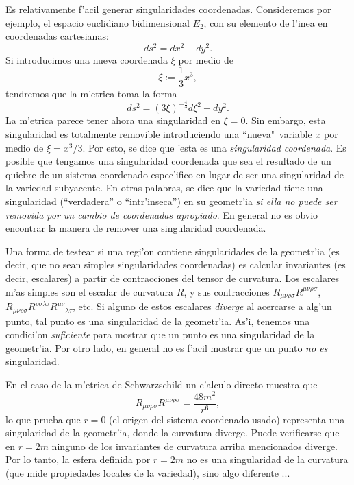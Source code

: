 Es relativamente f'acil generar singularidades coordenadas. Consideremos por ejemplo, el espacio euclidiano bidimensional $E_2$, con su elemento de l'inea en coordenadas cartesianas:
\begin{equation}
ds^2=dx^2+dy^2.
\end{equation}
Si introducimos una nueva coordenada $\xi$ por medio de
\begin{equation}
\xi:=\frac{1}{3}x^3,
\end{equation}
tendremos que la m'etrica toma la forma%
\begin{equation}
ds^2 =\left( 3\xi\right) ^{-\frac{4}{3}}d\xi^2+dy^2.
\end{equation}
La m'etrica parece tener ahora una singularidad en $\xi=0$. Sin embargo, esta
singularidad es totalmente removible introduciendo una ``nueva"\, variable $x$ por
medio de $\xi=x^3/3$. Por esto, se dice que 'esta es una
\textit{singularidad coordenada}. Es posible que tengamos una singularidad coordenada que sea el resultado de un quiebre de un sistema coordenado espec'ifico en lugar de ser una singularidad de la variedad subyacente. En otras palabras, se dice que la variedad tiene una singularidad (``verdadera'' o ``intr'inseca'') en su geometr'ia \textit{si ella no puede ser removida por un cambio de coordenadas apropiado}. En general no es obvio encontrar la manera de remover una singularidad coordenada.

Una forma de testear si una regi'on contiene singularidades de la geometr'ia (es decir, que no sean simples singularidades coordenadas) es calcular invariantes (es decir, escalares) a partir de contracciones del tensor de curvatura. Los escalares m'as simples son el escalar de curvatura
$R$, y sus contracciones $R_{\mu\nu\rho\sigma}R^{\mu\nu\rho\sigma}$, $R_{\mu\nu\rho\sigma}R^{\rho\sigma\lambda\tau}R^{\mu\nu}{}_{\lambda\tau}$, etc. Si alguno de estos escalares \textit{diverge} al acercarse a alg'un punto, tal punto es una singularidad de la geometr'ia. As'i, tenemos una condici'on \textit{suficiente}
para mostrar que un punto es una singularidad de la geometr'ia. Por otro lado, en general no es f'acil mostrar que un punto \textit{no es} singularidad.

En el caso de la m'etrica de Schwarzschild un c'alculo directo muestra que
\begin{equation}
R_{\mu\nu\rho\sigma}R^{\mu\nu\rho\sigma}=\frac{48m^2}{r^6},
\end{equation}
lo que prueba que $r=0$ (el origen del sistema coordenado usado) representa una
singularidad de la geometr'ia, donde la curvatura diverge. Puede verificarse que en $r=2m$ ninguno de los invariantes de curvatura arriba mencionados diverge. Por lo tanto, la esfera definida por $r=2m$ no es una singularidad de la curvatura (que mide propiedades locales de la variedad), sino algo diferente ...

